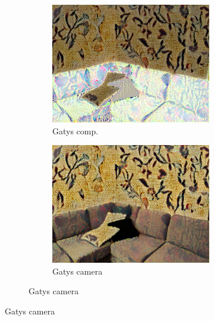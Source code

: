 \begin{figure}[]
\begin{subfigure}{\textwidth}
\begin{subfigure}{0.24\textwidth}
            \centering
            \includegraphics[width=\textwidth]{images/04-experiment02/sofa/flowers2/gatys_im.jpg}
            \caption*{Gatys comp.}
        \end{subfigure}
        \hfill
        \begin{subfigure}{0.24\textwidth}
            \centering
            \includegraphics[width=\textwidth]{images/04-experiment02/sofa/flowers2/gatys_proj.jpg}
            \caption*{Gatys camera}
        \end{subfigure}
        

\end{subfigure}
\end{figure}
